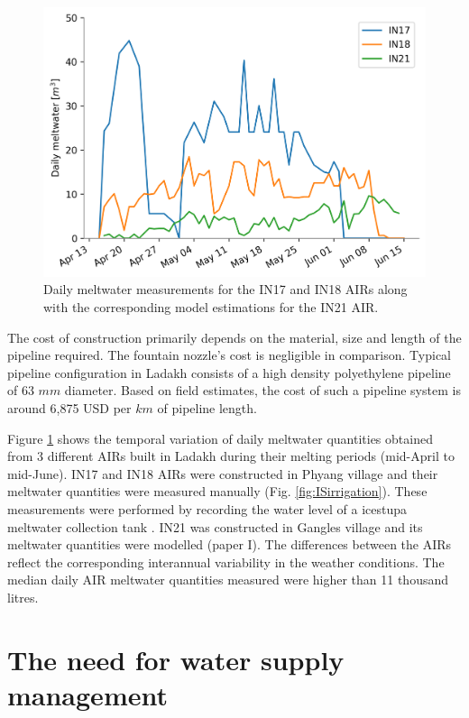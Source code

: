 \begin{figure}[htb]
	\centering
	\includegraphics[width=\textwidth]{figs/melt.png}
	\caption{Daily meltwater measurements for the IN17 and IN18 AIRs along with the corresponding model estimations
		for the IN21 AIR. }
	\label{fig:ISmelt}
\end{figure}

The cost of construction primarily depends on the material, size and length of the pipeline required. The
fountain nozzle's cost is negligible in comparison. Typical pipeline configuration in Ladakh consists of a high
density polyethylene pipeline of 63 $mm$ diameter. Based on field estimates, the cost of such a pipeline system
is around 6,875 USD per $km$ of pipeline length.

Figure \ref{fig:ISmelt} shows the temporal variation of daily meltwater quantities obtained from 3 different
AIRs built in Ladakh during their melting periods (mid-April to mid-June). IN17 and IN18 AIRs were constructed
in Phyang village and their meltwater quantities were measured manually (Fig. \ref{fig:ISirrigation}). These
measurements were performed by recording the water level of a icestupa meltwater collection tank
\citep{vermaIceStupaMeltwater2018}. IN21 was constructed in Gangles village and its meltwater quantities
were modelled (paper I). The differences between the AIRs reflect the corresponding interannual variability in the weather
conditions. The median daily AIR meltwater quantities measured were higher than 11 thousand litres.

\section{The need for water supply management}

